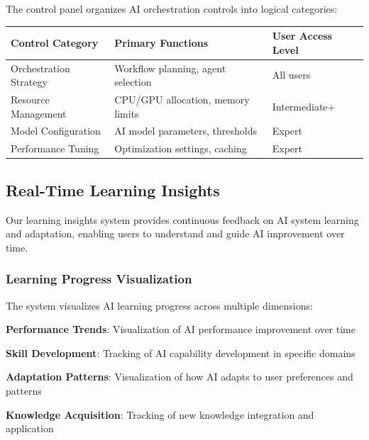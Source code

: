 The control panel organizes AI orchestration controls into logical categories:

\begin{center}
\begin{tabular}{@{}lll@{}}
\toprule
\textbf{Control Category} & \textbf{Primary Functions} & \textbf{User Access Level} \\
\midrule
Orchestration Strategy & Workflow planning, agent selection & All users \\
Resource Management & CPU/GPU allocation, memory limits & Intermediate+ \\
Model Configuration & AI model parameters, thresholds & Expert \\
Performance Tuning & Optimization settings, caching & Expert \\
\bottomrule
\end{tabular}
\end{center}

\subsection*{Real-Time Learning Insights}

Our learning insights system provides continuous feedback on AI system learning and adaptation, enabling users to understand and guide AI improvement over time.

\subsubsection*{Learning Progress Visualization}

The system visualizes AI learning progress across multiple dimensions:

\begin{compactlist}
    \item \textbf{Performance Trends}: Visualization of AI performance improvement over time
    \item \textbf{Skill Development}: Tracking of AI capability development in specific domains
    \item \textbf{Adaptation Patterns}: Visualization of how AI adapts to user preferences and patterns
    \item \textbf{Knowledge Acquisition}: Tracking of new knowledge integration and application
\end{compactlist}

